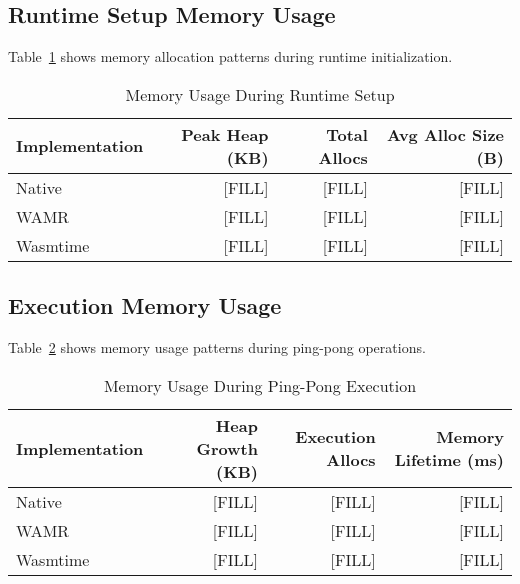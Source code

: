 \subsection{Runtime Setup Memory Usage}

Table~\ref{tab:memory-setup} shows memory allocation patterns during runtime initialization.

\begin{table}[htbp]
\centering
\caption{Memory Usage During Runtime Setup}
\label{tab:memory-setup}
\begin{tabular}{lrrr}
\toprule
\textbf{Implementation} & \textbf{Peak Heap (KB)} & \textbf{Total Allocs} & \textbf{Avg Alloc Size (B)} \\
\midrule
Native        & [FILL]    & [FILL]  & [FILL] \\
WAMR          & [FILL]    & [FILL]  & [FILL] \\
Wasmtime      & [FILL]    & [FILL]  & [FILL] \\
\bottomrule
\end{tabular}
\end{table}

\subsection{Execution Memory Usage}

Table~\ref{tab:memory-execution} shows memory usage patterns during ping-pong operations.

\begin{table}[htbp]
\centering
\caption{Memory Usage During Ping-Pong Execution}
\label{tab:memory-execution}
\begin{tabular}{lrrr}
\toprule
\textbf{Implementation} & \textbf{Heap Growth (KB)} & \textbf{Execution Allocs} & \textbf{Memory Lifetime (ms)} \\
\midrule
Native        & [FILL]    & [FILL]  & [FILL] \\
WAMR          & [FILL]    & [FILL]  & [FILL] \\
Wasmtime      & [FILL]    & [FILL]  & [FILL] \\
\bottomrule
\end{tabular}
\end{table}


